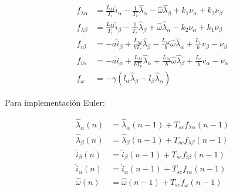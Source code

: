 \documentclass{article}
\begin{document}
            \begin{align*}
                f_{\lambda\alpha} &=  \frac{L_M}{T_r} \hat{i}_\alpha 
                    - \frac{1}{T_r} \hat{\lambda}_\alpha  
                    - \hat{\omega} \hat{\lambda}_\beta 
                    + k_1\nu_\alpha + k_2\nu_\beta  \\
                f_{\lambda\beta} &=  \frac{L_M}{T_r} \hat{i}_\beta 
                    - \frac{1}{T_r} \hat{\lambda}_\beta  
                    + \hat{\omega} \hat{\lambda}_\alpha 
                    - k_2\nu_\alpha + k_1\nu_\beta  \\
                f_{i\beta} &=  -a \hat{i}_\beta 
                    + \frac{L_M}{b T_r} \hat{\lambda}_\beta  
                    - \frac{L_M}{b} \hat{\omega} \hat{\lambda}_\alpha 
                    + \frac{L_r}{b} v_\beta 
                    - \nu_\beta \\
                f_{i\alpha} &=  -a \hat{i}_\alpha 
                    + \frac{L_M}{b T_r} \hat{\lambda}_\alpha  
                    + \frac{L_M}{b} \hat{\omega} \hat{\lambda}_\beta 
                    + \frac{L_r}{b} v_\alpha
                    - \nu_\alpha \\
                f_\omega &=  -\gamma \left( l_\alpha \hat{\lambda}_\beta 
                    - l_\beta \hat{\lambda}_\alpha  \right)                
            \end{align*}
            
            
            Para implementación Euler:
            
            \begin{equation}
                \begin{aligned}
                    \hat{\lambda}_\alpha(n) &= \hat{\lambda}_\alpha(n-1)
                        + T_{sc}  f_{\lambda\alpha}(n-1)  \\
                    \hat{\lambda}_\beta(n) &= \hat{\lambda}_\beta(n-1)
                        + T_{sc}  f_{\lambda\beta}(n-1) \\
                    \hat{i}_\beta(n) &= \hat{i}_\beta(n-1)
                        + T_{sc}  f_{i\beta}(n-1) \\
                    \hat{i}_\alpha(n) &= \hat{i}_\alpha(n-1) 
                        + T_{sc}  f_{i\alpha}(n-1) \\
                    \hat{\omega}(n) &= \hat{\omega}(n-1)
                        + T_{sc}  f_{\omega}(n-1)  
                \end{aligned}
            \end{equation}
\end{document}
